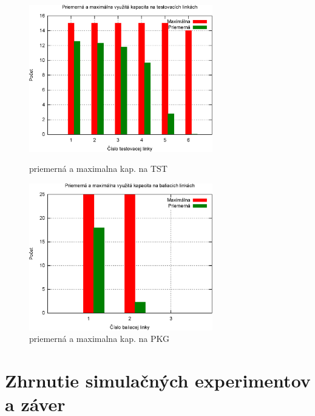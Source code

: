 \documentclass[12pt,a4paper,titlepage,final]{article}
\begin{document}
\begin{figure}[!h]
  \centering
  \begin{minipage}{0.45\linewidth}
  \centering
  \includegraphics[width=8cm]{doc/3_hist5.eps}
  \caption{priemerná a maximalna kap. na TST}
  \end{minipage}
  \quad
  \begin{minipage}{0.45\linewidth}
    \centering
    \includegraphics[width=8cm]{doc/3_hist6.eps}
    \caption{priemerná a maximalna kap. na PKG}
  \end{minipage}
\end{figure}

\newpage

\section{Zhrnutie simulačných experimentov a záver}
\end{document}
